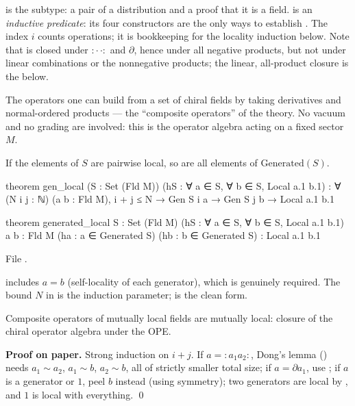 \begin{dictionary}
 is the subtype: a pair of a distribution  and a proof 
that it is a field.  is an \emph{inductive predicate}: its four constructors are the only
ways to establish . The index $i$ counts operations; it is bookkeeping for the
locality induction below. Note that  is closed under ${:}\cdot\,\cdot{:}$ and $\partial$,
hence under all negative products, but not under linear combinations or the nonnegative products;
the linear, all-product closure is the  below.
\end{dictionary}

\begin{physics}
The operators one can build from a set of chiral fields by taking derivatives and normal-ordered
products --- the ``composite operators'' of the theory. No vacuum and no grading are involved: this
is the operator algebra acting on a fixed sector $M$.
\end{physics}

\begin{theorem}\label{l03:thm:genlocal}
If the elements of $S$ are pairwise local, so are all elements of $\mathrm{Generated}(S)$.
\end{theorem}
\begin{leancode}
theorem gen_local (S : Set (Fld M)) (hS : ∀ a ∈ S, ∀ b ∈ S, Local a.1 b.1) :
    ∀ (N i j : ℕ) (a b : Fld M), i + j ≤ N → Gen S i a → Gen S j b → Local a.1 b.1

theorem generated_local {S : Set (Fld M)} (hS : ∀ a ∈ S, ∀ b ∈ S, Local a.1 b.1)
    {a b : Fld M} (ha : a ∈ Generated S) (hb : b ∈ Generated S) : Local a.1 b.1
\end{leancode}
File .

\begin{dictionary}
 includes $a = b$ (self-locality of each generator), which is genuinely required. The bound
$N$ in  is the induction parameter;  is the clean form.
\end{dictionary}

\begin{physics}
Composite operators of mutually local fields are mutually local: closure of the chiral operator algebra
under the OPE.
\end{physics}

\textbf{Proof on paper.} Strong induction on $i+j$. If $a = {:}a_1a_2{:}$, Dong's lemma
() needs $a_1\sim a_2$, $a_1\sim b$, $a_2\sim b$, all of strictly smaller total size;
if $a = \partial a_1$, use ; if $a$ is a generator or $1$, peel $b$ instead
(using symmetry); two generators are local by , and $1$ is local with everything. \qed

